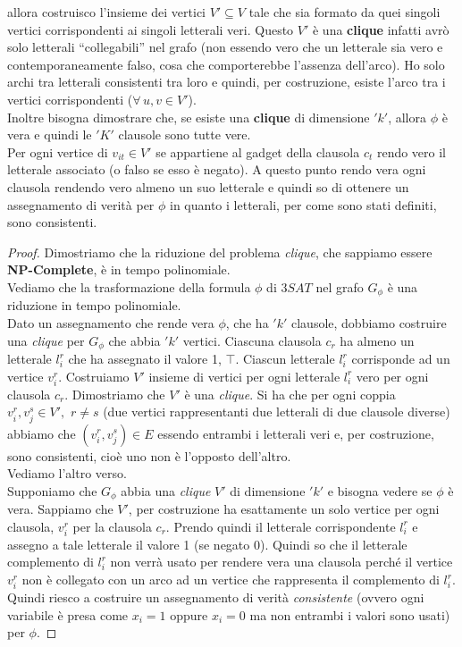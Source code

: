 							allora costruisco l'insieme dei vertici $V'\subseteq V$ tale che sia formato
							da quei singoli vertici corrispondenti ai singoli letterali veri. Questo $V'$
							è una \textbf{clique} infatti avrò solo letterali ``collegabili'' nel grafo
							(non essendo vero che un letterale sia vero e contemporaneamente falso, cosa
							che comporterebbe l'assenza dell'arco). Ho solo archi tra letterali
							consistenti tra loro e quindi, per costruzione, esiste l'arco tra i vertici
							corrispondenti ($\forall\, u,v\in V'$).\\
							Inoltre bisogna dimostrare che, se esiste una \textbf{clique} di dimensione
							$ 'k' $, allora $\phi$ è vera e quindi le $ 'K' $ clausole sono tutte vere. \\
							Per ogni vertice di $v_{it}\in V'$ se appartiene al gadget della clausola
							$c_t$ rendo vero il letterale associato (o falso se esso è negato). A questo
							punto rendo vera ogni clausola rendendo vero almeno un suo letterale e quindi
							so di ottenere un assegnamento di verità per $\phi$ in quanto i letterali, per
							come sono stati definiti, sono consistenti.
							\begin{proof}
								Dimostriamo che la riduzione del problema \textit{clique}, che sappiamo essere
								\textbf{NP-Complete}, è in tempo polinomiale.\\ 
								Vediamo che la trasformazione della formula $\phi$ di $3SAT$ nel grafo
								$G_\phi$ è una riduzione in tempo polinomiale.\\
								Dato un assegnamento che rende vera $\phi$, che ha $ 'k' $ clausole, dobbiamo
								costruire una \textit{clique} per $G_\phi$ che abbia $ 'k' $ vertici. Ciascuna
								clausola $c_{r}$ ha almeno un letterale $l_{i}^r$ che ha assegnato il valore 1,
								$\top$. Ciascun letterale $l_{i}^r$ corrisponde ad un vertice
								$v_{i}^r$. Costruiamo $V'$ insieme di vertici per ogni letterale $l_i^r$ vero
								per ogni clausola $c_r$. Dimostriamo che $V'$ è una \textit{clique}. Si ha che
								per ogni coppia $v_i^r,v_j^s\in V',\,\,r\neq s$ (due vertici rappresentanti
								due letterali di due clausole diverse) abbiamo che $(v_i^r,v_j^s)\in
								E$ essendo entrambi i letterali veri e, per costruzione, sono consistenti, cioè
								uno non è l'opposto dell'altro.\\
								Vediamo l'altro verso.\\
								Supponiamo che $G_\phi$ abbia una \textit{clique} $V'$ di dimensione $ 'k' $ e
								bisogna vedere se $\phi$ è vera. Sappiamo che $V'$, per costruzione ha
								esattamente un solo vertice per ogni clausola, $v_i^r$ per la clausola
								$c_r$. Prendo quindi il letterale corrispondente $l_i^r$ e assegno a tale
								letterale il valore 1 (se negato 0). Quindi so che il letterale complemento di
								$l_i^r$ non verrà usato per rendere vera una clausola perché il vertice
								$v_i^r$ non è collegato con un arco ad un vertice che rappresenta il
								complemento di $l_i^r$. Quindi riesco a costruire un assegnamento di verità
								\textit{consistente} (ovvero ogni variabile è presa come $x_i=1$ oppure
								$x_i=0$ ma non entrambi i valori sono usati) per $\phi$.
							\end{proof}
